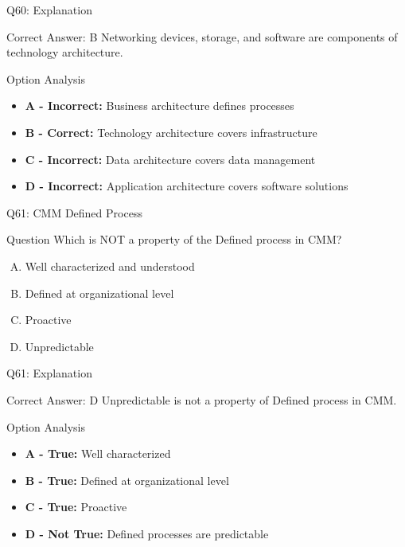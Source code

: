 \documentclass{beamer}
\begin{document}
	\begin{frame}{Q60: Explanation}
		\begin{block}{Correct Answer: B}
			Networking devices, storage, and software are components of technology architecture.
		\end{block}
		\begin{block}{Option Analysis}
			\begin{itemize}
				\item \textbf{A - Incorrect:} Business architecture defines processes
				\item \textbf{B - Correct:} Technology architecture covers infrastructure
				\item \textbf{C - Incorrect:} Data architecture covers data management
				\item \textbf{D - Incorrect:} Application architecture covers software solutions
			\end{itemize}
		\end{block}
	\end{frame}
	
	\begin{frame}{Q61: CMM Defined Process}
		\begin{block}{Question}
			Which is NOT a property of the Defined process in CMM?
		\end{block}
		\begin{enumerate}[(A)]
			\item Well characterized and understood
			\item Defined at organizational level
			\item Proactive
			\item Unpredictable
		\end{enumerate}
	\end{frame}
	
	\begin{frame}{Q61: Explanation}
		\begin{block}{Correct Answer: D}
			Unpredictable is not a property of Defined process in CMM.
		\end{block}
		\begin{block}{Option Analysis}
			\begin{itemize}
				\item \textbf{A - True:} Well characterized
				\item \textbf{B - True:} Defined at organizational level
				\item \textbf{C - True:} Proactive
				\item \textbf{D - Not True:} Defined processes are predictable
			\end{itemize}
		\end{block}
	\end{frame}
	
\end{document}
